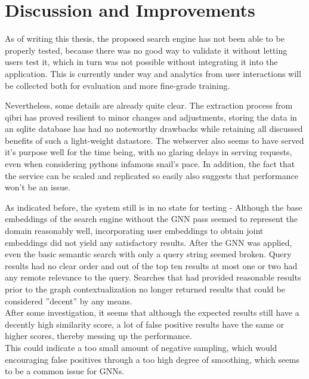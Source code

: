 \documentclass[draft,final]{vutinfth} %
\begin{document}





\chapter{Discussion and Improvements} \label{chap:discussion}
As of writing this thesis, the proposed search engine has not been able to be properly tested, because there was no good way to validate it without letting users test it, which in turn was not possible without integrating it into the application. This is currently under way and analytics from user interactions will be collected both for evaluation and more fine-grade training.

Nevertheless, some details are already quite clear. The extraction process from qibri has proved resilient to minor changes and adjustments, storing the data in an sqlite database has had no noteworthy drawbacks while retaining all discussed benefits of such a light-weight datastore. The webserver also seems to have served it's purpose well for the time being, with no glaring delays in serving requests, even when considering pythons infamous snail's pace. In addition, the fact that the service can be scaled and replicated so easily also suggests that performance won't be an issue. 

As indicated before, the system still is in no state for testing - Although the base embeddings of the search engine without the GNN pass seemed to represent the domain reasonably well, incorporating user embeddings to obtain joint embeddings did not yield any satisfactory results. After the GNN was applied, even the basic semantic search with only a query string seemed broken. Query results had no clear order and out of the top ten results at most one or two had any remote relevance to the query. Searches that had provided reasonable results prior to the graph contextualization no longer returned results that could be considered ''decent'' by any means. \\
After some investigation, it seems that although the expected results still have a decently high similarity score, a lot of false positive results have the same or higher scores, thereby messing up the performance. \\
This could indicate a too small amount of negative sampling, which would encouraging false positives through a too high degree of smoothing, which seems to be a common issue for GNNs. 
\end{document}
